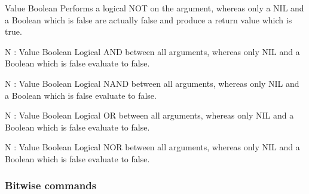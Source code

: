     \begin{commands}

                {Value}
                {Boolean}
                {
                    Performs a logical NOT on the argument, whereas only a NIL
                    and a Boolean which is false are actually false and produce
                    a return value which is true.
                }

                {N : Value}
                {Boolean}
                {
                    Logical AND between all arguments, whereas only NIL and a
                    Boolean which is false evaluate to false.
                }

                {N : Value}
                {Boolean}
                {
                    Logical NAND between all arguments, whereas only NIL and a
                    Boolean which is false evaluate to false.
                }

                {N : Value}
                {Boolean}
                {
                    Logical OR between all arguments, whereas only NIL and a
                    Boolean which is false evaluate to false.
                }

                {N : Value}
                {Boolean}
                {
                    Logical NOR between all arguments, whereas only NIL and a
                    Boolean which is false evaluate to false.
                }

    \end{commands}

\subsubsection{Bitwise commands}



